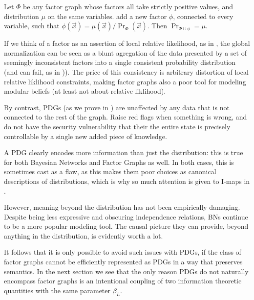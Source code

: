 \documentclass{article}
\numberwithin{equation}{section}
\begin{document}
	\begin{example}\label{ex:fg-volatile-2}
		Let $\Phi$ be any factor graph whose factors all take strictly positive values, and distribution $\mu$ on the same variables. add a new factor $\phi$, connected to every variable, such that $\phi(\vec x) = {\mu(\vec x)}/{\Pr_\Phi(\vec x)}$. Then $\Pr_{\Phi \cup \phi} = \mu$. 
	\end{example}

	If we think of a factor as an assertion of local relative likelihood, as in , the global normalization can be seen as a blunt agregation of the data presented by a set of seemingly inconsistent factors into a single consistent probability distribution (and can fail, as in )). The price of this consistency is arbitrary distortion of local relative liklihood constraints, making factor graphs also a poor tool for modeling modular beliefs (at least not about relative liklihood). 
	
	By contrast, PDGs (as we prove in ) are unaffected by any data that is not connected to the rest of the graph. Raise red flags when something is wrong, and do not have the security vulnerability that their the entire state is precisely controllable by a single new added piece of knowledge.
	\begin{vfull}
		A PDG clearly encodes more information than just the distribution: this is true for both Bayesian Networks and Factor Graphs as well. In both cases, this is sometimes cast as a flaw, as this makes them poor choices as canonical descriptions of distributions, which is why so much attention is given to I-maps in \parencite{koller2009probabilistic}. 
		
		However, meaning beyond the distribution has not been empirically damaging. Despite being less expressive and obscuring independence relations, BNs continue to be a more popular modeling tool. The causal picture they can provide, beyond anything in the distribution, is evidently worth a lot.
	\end{vfull}
	It follows that it is only possible to avoid such issues with PDGs, if the class of factor graphs cannot be efficiently represented as PDGs in a way that preserves semantics.
	In the next section we see that the only reason PDGs do not naturally encompass factor graphs is an intentional coupling of two information theoretic quantities with the same parameter $\beta_L$. 
%
\end{document}
